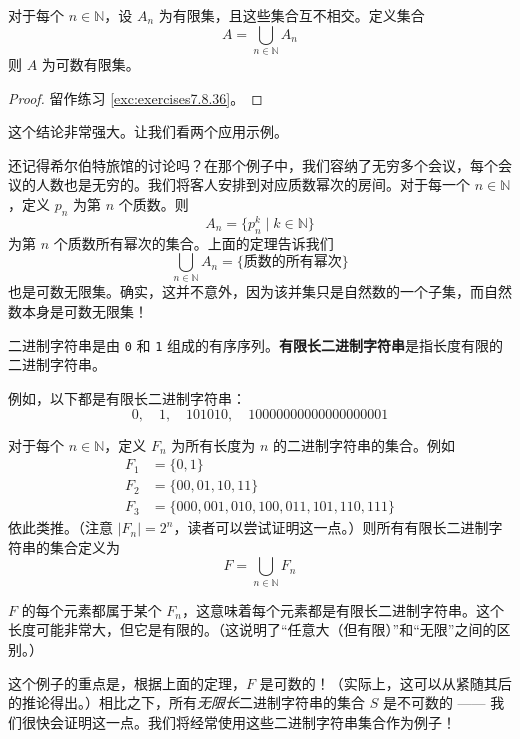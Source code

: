 \begin{corollary}\label{corollary7.6.23}
    对于每个 $n \in \mathbb{N}$，设 $A_n$ 为有限集，且这些集合互不相交。定义集合
    \[A = \bigcup_{n \in \mathbb{N}} A_n\]
    则 $A$ 为可数有限集。
\end{corollary}

\begin{proof}
    留作练习 \ref{exc:exercises7.8.36}。
\end{proof}

这个结论非常强大。让我们看两个应用示例。\\

\begin{example}[所有质数幂次的集合]
    还记得希尔伯特旅馆的讨论吗？在那个例子中，我们容纳了无穷多个会议，每个会议的人数也是无穷的。我们将客人安排到对应质数幂次的房间。对于每一个 $n \in \mathbb{N}$，定义 $p_n$ 为第 $n$ 个质数。则
    \[A_n = \{p_n^k \mid k \in \mathbb{N}\}\]
    为第 $n$ 个质数所有幂次的集合。上面的定理告诉我们
    \[\bigcup_{n \in \mathbb{N}} A_n = \{\text{质数的所有幂次}\}\]
    也是可数无限集。确实，这并不意外，因为该并集只是自然数的一个子集，而自然数本身是可数无限集！
\end{example}

\begin{example}[所有有限长二进制字符串的集合]\label{ex:example7.6.25}
    二进制字符串是由 \verb|0| 和 \verb|1| 组成的有序序列。\textbf{有限长二进制字符串}是指长度有限的二进制字符串。

    例如，以下都是有限长二进制字符串：
    \[0, \quad 1, \quad 101010, \quad 10000000000000000001 \]

    对于每个 $n \in \mathbb{N}$，定义 $F_n$ 为所有长度为 $n$ 的二进制字符串的集合。例如
    \begin{align*}
        F_1 & = \{ 0 , 1 \}                                         \\
        F_2 & = \{ 00 , 01 , 10 , 11 \}                             \\
        F_3 & = \{ 000 , 001 , 010 , 100 , 011 , 101 , 110 , 111 \}
    \end{align*}
    依此类推。（注意 $|F_n| = 2^n$，读者可以尝试证明这一点。）则所有有限长二进制字符串的集合定义为
    \[F = \bigcup_{n \in \mathbb{N}} F_n\]

    $F$ 的每个元素都属于某个 $F_n$，这意味着每个元素都是有限长二进制字符串。这个长度可能非常大，但它是有限的。（这说明了``任意大（但有限）''和``无限''之间的区别。）

    这个例子的重点是，根据上面的定理，$F$ 是可数的！（实际上，这可以从紧随其后的推论得出。）相比之下，所有\emph{无限长}二进制字符串的集合 $S$ 是不可数的 —— 我们很快会证明这一点。我们将经常使用这些二进制字符串集合作为例子！
\end{example}

